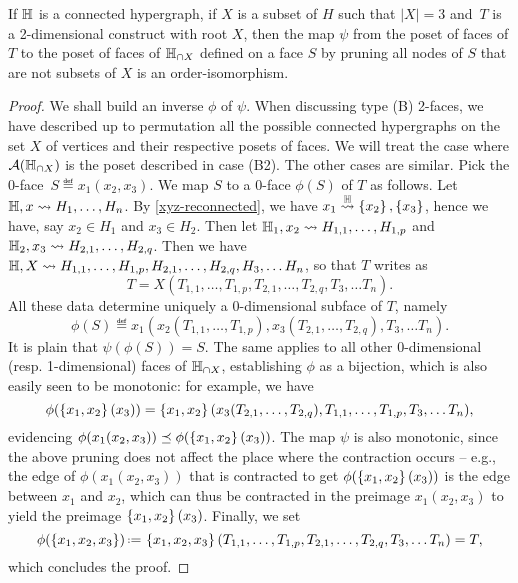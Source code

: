 \begin{lemma} 
  \label{instance-construct} 
  If ${\mathbb H}$ is a connected hypergraph, if $X$ is a subset of $H$ such that $|X|=3$ and~$T$ is a 2-dimensional construct with root $X$, then the map $\psi$ from the poset of  faces of $T$ to the poset of faces of 
${\mathbb H}_{\cap X}$ defined on a face $S$  by pruning all nodes of $S$ that are not subsets of $X$ is an order-isomorphism.
\end{lemma}

\begin{proof}
We shall build an inverse $\phi$ of $\psi$.
When discussing type (B) 2-faces, we have described up to permutation all the possible connected hypergraphs on the set $X$ of vertices and their respective posets of faces. 
We will treat the case where ${\cal A}({\mathbb H}_{\cap X})$ is the poset described in case (B2). The other cases are similar.
Pick the 0-face~$S\eqdef  x_1(x_2,x_3)$. 
We map $S$ to a $0$-face $\phi(S)$ of $T$ as follows. 
Let ${\mathbb H},x\leadsto H_1,\ldots,H_n$. 
By \cref{xyz-reconnected}, we have $x_1\stackrel{{\mathbb H}}{\rightsquigarrow}\left\{x_2\right\},\left\{x_3\right\}$, hence we have, say $x_2\in H_1$ and $x_3\in H_2$. Then let
  ${\mathbb H_1},x_2\leadsto H_{1,1},\ldots,H_{1,p}$ and ${\mathbb H_2},x_3\leadsto H_{2,1},\ldots,H_{2,q}$.
  Then we have ${\mathbb H},X\leadsto H_{1,1},\ldots,H_{1,p},H_{2,1},\ldots,H_{2,q},H_3,\ldots H_n$, so that $T$ writes as
  $$T= X(T_{1,1},\ldots,T_{1,p},T_{2,1},\ldots,T_{2,q},T_3,\ldots T_n).$$ 
All these data determine uniquely a 0-dimensional subface of $T$, namely
  $$\phi(S)\eqdef x_1(x_2(T_{1,1},\ldots,T_{1,p}),x_3(T_{2,1},\ldots,T_{2,q}),T_3,\ldots T_n).$$
It is plain that $\psi(\phi(S))=S$.
  The same applies to all other 0-dimensional (resp. 1-dimensional) faces of ${\mathbb H}_{\cap X}$, establishing $\phi$ as a bijection, which is also easily seen to be monotonic: for example, we have
 $$\phi(\left\{x_1,x_2\right\}(x_3))= \left\{x_1,x_2\right\}(x_3(T_{2,1},\ldots,T_{2,q}),T_{1,1},\ldots,T_{1,p},T_3,\ldots T_n),$$
 evidencing $\phi(x_1(x_2,x_3))\preceq \phi(\left\{x_1,x_2\right\}(x_3))$. 
 The map $\psi$ is also monotonic, since the above pruning does not affect the place where the contraction occurs -- e.g., the edge of $\phi(x_1(x_2,x_3))$ that is contracted to get $\phi(\left\{x_1,x_2\right\}(x_3))$ is the edge between $x_1$ and $x_2$, which can thus be contracted in the preimage $x_1(x_2,x_3)$ to yield the preimage $\left\{x_1,x_2\right\}(x_3)$.
 Finally, we set
 $$\phi(\set{x_1,x_2,x_3})\eqdef \set{x_1,x_2,x_3}(T_{1,1},\ldots,T_{1,p},T_{2,1},\ldots,T_{2,q},T_3,\ldots T_n)=T,$$
 which concludes the proof.
 \end{proof}

